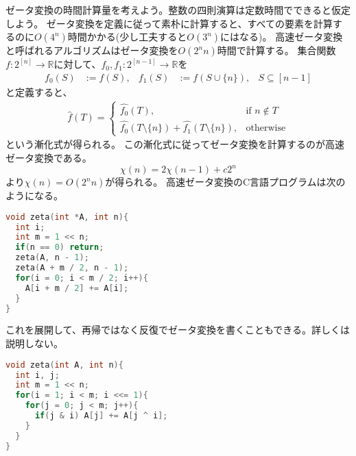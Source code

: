 \documentclass[a4paper,twoside,onecolumn,openany,article,10pt]{memoir}
\theoremstyle{definition}
\theoremstyle{remark}
\begin{document}
ゼータ変換の時間計算量を考えよう。整数の四則演算は定数時間でできると仮定しよう。
ゼータ変換を定義に従って素朴に計算すると、すべての要素を計算するのに$O(4^n)$時間かかる(少し工夫すると$O(3^n)$にはなる)。
高速ゼータ変換と呼ばれるアルゴリズムはゼータ変換を$O(2^n n)$時間で計算する。
集合関数$f\colon 2^{[n]}\to\mathbb{R}$に対して、$f_0, f_1\colon 2^{[n-1]}\to\mathbb{R}$を
\begin{align*}
f_0(S) &:= f(S), & f_1(S) &:= f(S\cup\{n\}),& S\subseteq[n-1]
\end{align*}
と定義すると、
\begin{align*}
\widehat{f}(T) =
\begin{cases}
\widehat{f_0}(T),&\text{if } n\notin T\\
\widehat{f_0}(T\setminus\{n\})+\widehat{f_1}(T\setminus\{n\}),&\text{otherwise}
\end{cases}
\end{align*}
という漸化式が得られる。
この漸化式に従ってゼータ変換を計算するのが高速ゼータ変換である。
\begin{equation*}
\chi(n) = 2\chi(n-1) + c2^n
\end{equation*}
より$\chi(n) = O(2^n n)$が得られる。
高速ゼータ変換のC言語プログラムは次のようになる。
\begin{lstlisting}[basicstyle=\ttfamily\normalsize,showstringspaces=false,language=C,frame=single]
void zeta(int *A, int n){
  int i;
  int m = 1 << n;
  if(n == 0) return;
  zeta(A, n - 1);
  zeta(A + m / 2, n - 1);
  for(i = 0; i < m / 2; i++){
    A[i + m / 2] += A[i];
  }
}
\end{lstlisting}
これを展開して、再帰ではなく反復でゼータ変換を書くこともできる。詳しくは説明しない。
\begin{lstlisting}[basicstyle=\ttfamily\normalsize,showstringspaces=false,language=C,frame=single]
void zeta(int A, int n){
  int i, j;
  int m = 1 << n;
  for(i = 1; i < m; i <<= 1){
    for(j = 0; j < m; j++){
      if(j & i) A[j] += A[j ^ i];
    }
  }
}
\end{lstlisting}
\end{document}
